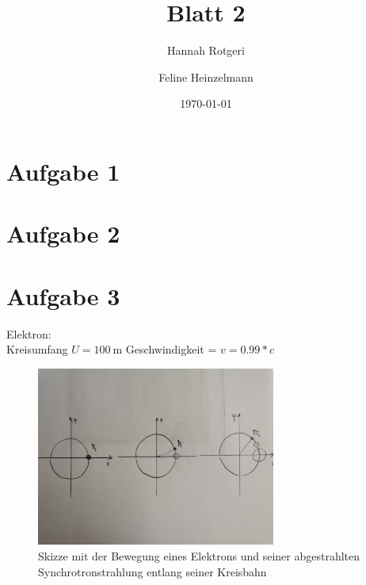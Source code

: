 \documentclass[11pt,a4paper]{article}
\title{Blatt 2}
\date{\today}
\author{Hannah Rotgeri \and Feline Heinzelmann}
\begin{document}
    \maketitle

    \section*{Aufgabe 1}

    \section*{Aufgabe 2}

    \section*{Aufgabe 3}
        Elektron: \\
            Kreisumfang \(U = \SI{100}{\metre}\)
            Geschwindigkeit = \( v = 0.99*c \)
        \begin{figure}[h]
            \centering
            \includegraphics[width=0.7\textwidth]{Synchrotron_Skizze.jpg}
            \caption{Skizze mit der Bewegung eines Elektrons und seiner abgestrahlten Synchrotronstrahlung entlang seiner Kreisbahn}
        \end{figure}
\end{document}

